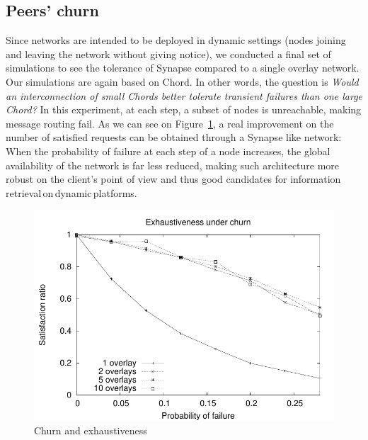 \subsection{Peers' churn}
%
Since networks are intended to be deployed in dynamic settings (nodes
joining and leaving the network without giving notice), we conducted a
final set of simulations to see the tolerance of Synapse compared to a
single overlay network. Our simulations are again based on Chord. In
other words, the question is \emph{Would an interconnection of small
  Chords better tolerate transient failures than one large Chord?} In
this experiment, at each step, a subset of nodes is unreachable,
making message routing fail. As we can see on
Figure~\ref{fig:churn-sat}, a real improvement on the number of
satisfied requests can be obtained through a Synapse like network:
When the probability of failure at each step of a node increases, the
global availability of the network is far less reduced, making such
architecture more robust on the client's point of view and thus good
candidates for information\,retrieval\,on\,dynamic\,platforms.
%
\begin{figure}
        \includegraphics[width=\linewidth]{fig/churn-sat.pdf}
        \caption{Churn and exhaustiveness\label{fig:churn-sat}}
\end{figure}

